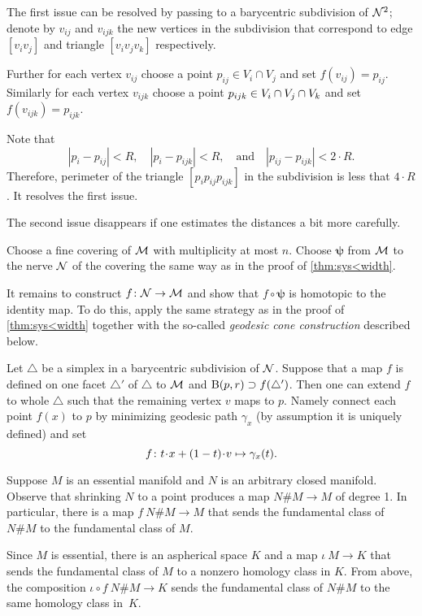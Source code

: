 The first issue can be resolved by passing to a barycentric subdivision of $\mathcal{N}^2$;
denote by $v_{ij}$ and $v_{ijk}$ the new vertices in the subdivision that correspond to edge $[v_iv_j]$ and triangle $[v_iv_jv_k]$ respectively.

Further for each vertex $v_{ij}$ choose a point $p_{ij}\in V_i\cap V_j$ and set $f(v_{ij})=p_{ij}$.
Similarly for each vertex $v_{ijk}$ choose a point $p_{ijk}\z\in V_i\cap V_j\cap V_k$ and set $f(v_{ijk})=p_{ijk}$.

Note that 
\[|p_i-p_{ij}|<R,\quad |p_i-p_{ijk}|<R,\quad\text{and}\quad |p_{ij}-p_{ijk}|<2\cdot R.\]
Therefore, perimeter of the triangle $[p_ip_{ij}p_{ijk}]$ in the subdivision is less that $4\cdot R$.
It resolves the first issue.

The second issue disappears if one estimates the distances a bit more carefully.
 
Choose a fine covering of $\mathcal{M}$ with multiplicity at most $n$.
Choose $\bm{\psi}$ from $\mathcal{M}$ to the nerve $\mathcal{N}$ of the covering the same way as in the proof of \ref{thm:sys<width}.

It remains to construct $f\colon\mathcal{N}\to\mathcal{M}$ and show that $f\circ\bm{\psi}$ is homotopic to the identity map.
To do this, apply the same strategy as in the proof of \ref{thm:sys<width} together with the so-called \emph{geodesic cone construction}
described below.

Let $\triangle$ be a simplex in a barycentric subdivision of $\mathcal{N}$.
Suppose that a map $f$ is defined on one facet $\triangle'$ of $\triangle$ to $\mathcal{M}$ and $\mathrm{B}{}(p,r)\supset f(\triangle')$.
Then one can extend $f$ to whole $\triangle$ such that the remaining vertex $v$ maps to $p$.
Namely connect each point $f(x)$ to $p$ by minimizing geodesic path $\gamma_x$ (by assumption it is uniquely defined) and set
\[f
\:
t\cdot x\z+(1-t)\cdot v
\mapsto
\gamma_x(t).\]

Suppose $M$ is an essential manifold and $N$ is an arbitrary closed manifold.
Observe that shrinking $N$ to a point produces a map $N\#M\to M$ of degree 1.
In particular, there is a map $f\:N\#M\to M$ that sends the fundamental class of $N\#M$ to the fundamental class of $M$.

Since $M$ is essential, there is an aspherical space $K$ and a map $\iota\:M\to K$ that sends the fundamental class of $M$ to a nonzero homology class in $K$.
From above, the composition $\iota\circ f\:N\#M\to K$ sends the fundamental class of $N\#M$ to the same homology class in~$K$.



